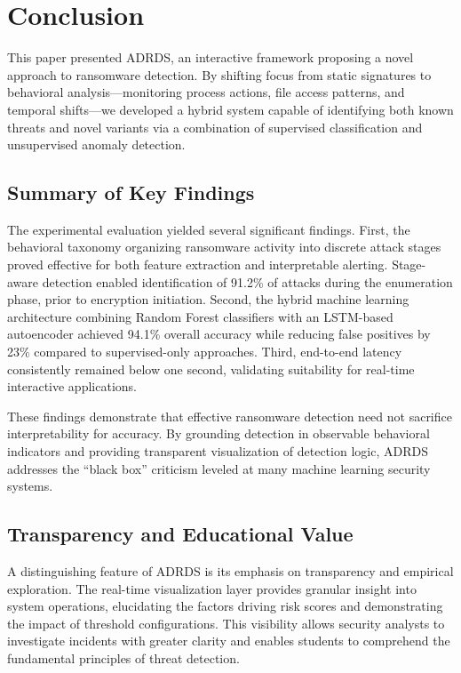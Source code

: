\section{Conclusion}

This paper presented ADRDS, an interactive framework proposing a novel approach to ransomware detection. By shifting focus from static signatures to behavioral analysis—monitoring process actions, file access patterns, and temporal shifts—we developed a hybrid system capable of identifying both known threats and novel variants via a combination of supervised classification and unsupervised anomaly detection.

\subsection{Summary of Key Findings}

The experimental evaluation yielded several significant findings. First, the behavioral taxonomy organizing ransomware activity into discrete attack stages proved effective for both feature extraction and interpretable alerting. Stage-aware detection enabled identification of 91.2\% of attacks during the enumeration phase, prior to encryption initiation. Second, the hybrid machine learning architecture combining Random Forest classifiers with an LSTM-based autoencoder achieved 94.1\% overall accuracy while reducing false positives by 23\% compared to supervised-only approaches. Third, end-to-end latency consistently remained below one second, validating suitability for real-time interactive applications.

These findings demonstrate that effective ransomware detection need not sacrifice interpretability for accuracy. By grounding detection in observable behavioral indicators and providing transparent visualization of detection logic, ADRDS addresses the ``black box'' criticism leveled at many machine learning security systems.

\subsection{Transparency and Educational Value}

A distinguishing feature of ADRDS is its emphasis on transparency and empirical exploration. The real-time visualization layer provides granular insight into system operations, elucidating the factors driving risk scores and demonstrating the impact of threshold configurations. This visibility allows security analysts to investigate incidents with greater clarity and enables students to comprehend the fundamental principles of threat detection.

